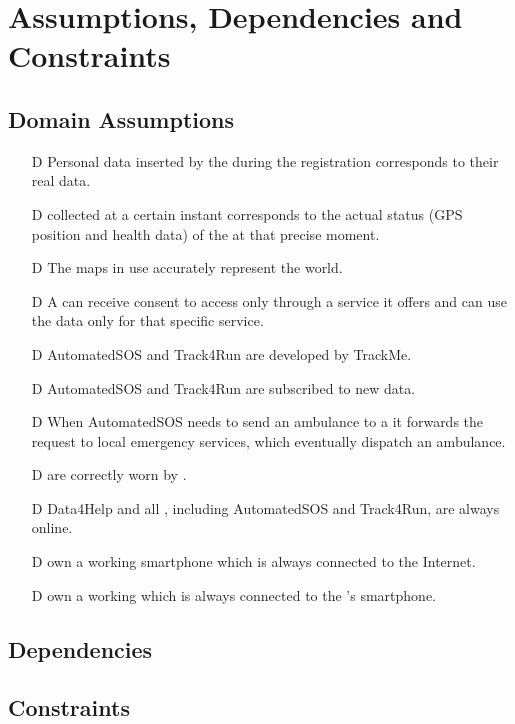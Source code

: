 \documentclass[../../rasd.tex]{subfiles}
\begin{document}
\section{Assumptions, Dependencies and Constraints}
		\subsection{Domain Assumptions}
			 	\begin{itemize}
				 	\item[D\subs{1}]Personal data inserted by the  during the registration corresponds to their real data.
					\item[D\subs{2}] collected at a certain instant corresponds to the actual status (GPS position and health data) of the  at that precise moment.				
					\item[D\subs{4}]The maps in use accurately represent the world.
					\item[D\subs{5}]A  can receive consent to  access only through a service it offers and can use the data only for that specific service.
					\item[D\subs{6}]AutomatedSOS and Track4Run are  developed by TrackMe.
					\item[D\subs{7}]AutomatedSOS and Track4Run are subscribed to new data.
					\item[D\subs{8}]When AutomatedSOS needs to send an ambulance to a  it forwards the request to local emergency services, which eventually dispatch an ambulance.
					\item[D\subs{9}] are correctly worn by .
					\item[D\subs{10}]Data4Help and all , including AutomatedSOS and Track4Run, are always online.
					\item[D\subs{11}] own a working smartphone which is always connected to the Internet.
					\item[D\subs{12}] own a working  which is always connected to the 's smartphone.
				\end{itemize}	
		\subsection{Dependencies}
		\subsection{Constraints}
\end{document}
